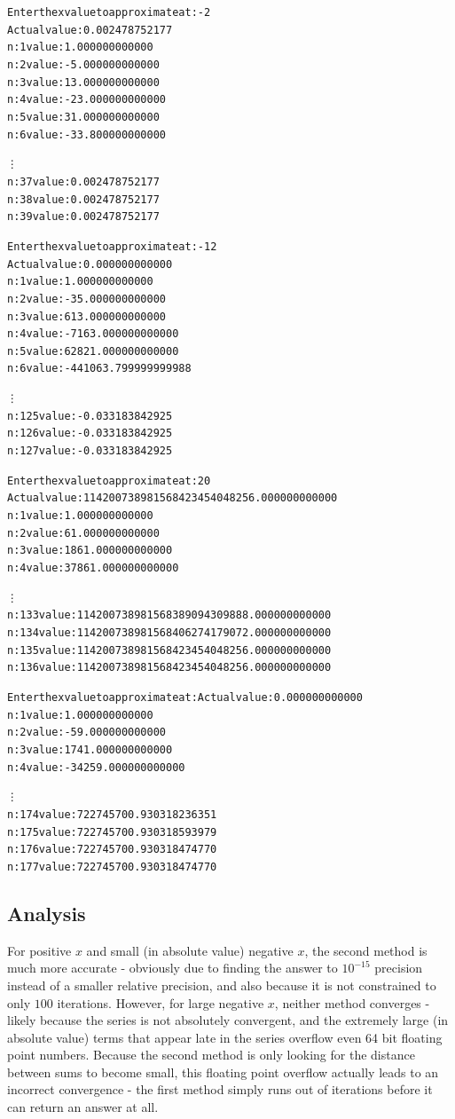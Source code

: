 \documentclass[11pt]{article} %
\begin{document}
\begin{alltt}
Enter the x value to approximate at: -2
Actual value: 0.002478752177 
n: 1	value: 1.000000000000
n: 2	value: -5.000000000000
n: 3	value: 13.000000000000
n: 4	value: -23.000000000000
n: 5	value: 31.000000000000
n: 6	value: -33.800000000000

\vdots
n: 37	value: 0.002478752177
n: 38	value: 0.002478752177
n: 39	value: 0.002478752177
\end{alltt}

\begin{alltt}
Enter the x value to approximate at: -12
Actual value: 0.000000000000 
n: 1	value: 1.000000000000
n: 2	value: -35.000000000000
n: 3	value: 613.000000000000
n: 4	value: -7163.000000000000
n: 5	value: 62821.000000000000
n: 6	value: -441063.799999999988

\vdots 
n: 125	 value: -0.033183842925
n: 126	 value: -0.033183842925
n: 127	 value: -0.033183842925

\end{alltt}

\begin{alltt}
Enter the x value to approximate at: 20
Actual value: 114200738981568423454048256.000000000000 
n: 1	value: 1.000000000000
n: 2	value: 61.000000000000
n: 3	value: 1861.000000000000
n: 4	value: 37861.000000000000

\vdots
n: 133	value: 114200738981568389094309888.000000000000
n: 134	value: 114200738981568406274179072.000000000000
n: 135	value: 114200738981568423454048256.000000000000
n: 136	value: 114200738981568423454048256.000000000000

\end{alltt}

\begin{alltt}
Enter the x value to approximate at: Actual value: 0.000000000000 
n: 1	value: 1.000000000000
n: 2	value: -59.000000000000
n: 3	value: 1741.000000000000
n: 4	value: -34259.000000000000

\vdots
n: 174	value: 722745700.930318236351
n: 175	value: 722745700.930318593979
n: 176	value: 722745700.930318474770
n: 177	value: 722745700.930318474770
\end{alltt}

\subsection*{Analysis}
\par For positive $x$ and small (in absolute value) negative $x$, the second method is much more accurate - obviously due to finding the answer to $10^{-15}$ precision instead of a smaller relative precision, and also because it is not constrained to only $100$ iterations. However, for large negative $x$, neither method converges - likely because the series is not absolutely convergent, and the extremely large (in absolute value) terms that appear late in the series overflow even 64 bit floating point numbers. Because the second method is only looking for the distance between sums to become small, this floating point overflow actually leads to an incorrect convergence - the first method simply runs out of iterations before it can return an answer at all.
\end{document}
